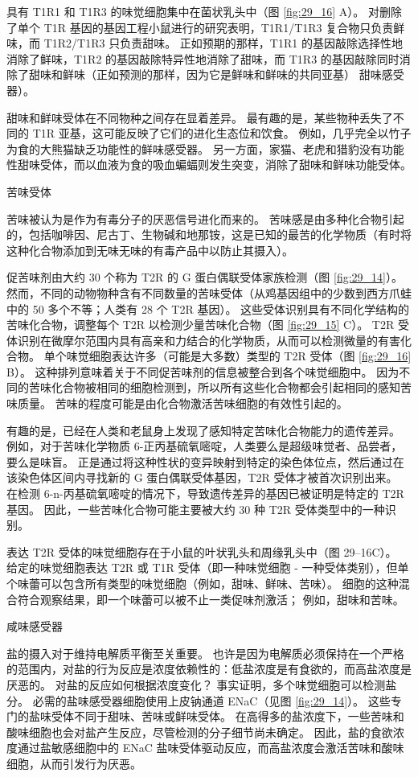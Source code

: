 具有 T1R1 和 T1R3 的味觉细胞集中在菌状乳头中（图 \ref{fig:29_16} A）。 对删除了单个 T1R 基因的基因工程小鼠进行的研究表明，T1R1/T1R3 复合物只负责鲜味，而 T1R2/T1R3 只负责甜味。 正如预期的那样，T1R1 的基因敲除选择性地消除了鲜味，T1R2 的基因敲除特异性地消除了甜味，而 T1R3 的基因敲除同时消除了甜味和鲜味（正如预测的那样，因为它是鲜味和鲜味的共同亚基） 甜味感受器）。

甜味和鲜味受体在不同物种之间存在显着差异。 最有趣的是，某些物种丢失了不同的 T1R 亚基，这可能反映了它们的进化生态位和饮食。 例如，几乎完全以竹子为食的大熊猫缺乏功能性的鲜味感受器。 另一方面，家猫、老虎和猎豹没有功能性甜味受体，而以血液为食的吸血蝙蝠则发生突变，消除了甜味和鲜味功能受体。

苦味受体

苦味被认为是作为有毒分子的厌恶信号进化而来的。 苦味感是由多种化合物引起的，包括咖啡因、尼古丁、生物碱和地那铵，这是已知的最苦的化学物质（有时将这种化合物添加到无味无味的有毒产品中以防止其摄入）。

促苦味剂由大约 30 个称为 T2R 的 G 蛋白偶联受体家族检测（图 \ref{fig:29_14}）。 然而，不同的动物物种含有不同数量的苦味受体（从鸡基因组中的少数到西方爪蛙中的 50 多个不等；人类有 28 个 T2R 基因）。 这些受体识别具有不同化学结构的苦味化合物，调整每个 T2R 以检测少量苦味化合物（图 \ref{fig:29_15} C）。 T2R 受体识别在微摩尔范围内具有高亲和力结合的化学物质，从而可以检测微量的有害化合物。 单个味觉细胞表达许多（可能是大多数）类型的 T2R 受体（图 \ref{fig:29_16} B）。 这种排列意味着关于不同促苦味剂的信息被整合到各个味觉细胞中。 因为不同的苦味化合物被相同的细胞检测到，所以所有这些化合物都会引起相同的感知苦味质量。 苦味的程度可能是由化合物激活苦味细胞的有效性引起的。

有趣的是，已经在人类和老鼠身上发现了感知特定苦味化合物能力的遗传差异。 例如，对于苦味化学物质 6-正丙基硫氧嘧啶，人类要么是超级味觉者、品尝者，要么是味盲。 正是通过将这种性状的变异映射到特定的染色体位点，然后通过在该染色体区间内寻找新的 G 蛋白偶联受体基因，T2R 受体才被首次识别出来。 在检测 6-n-丙基硫氧嘧啶的情况下，导致遗传差异的基因已被证明是特定的 T2R 基因。 因此，一些苦味化合物可能主要被大约 30 种 T2R 受体类型中的一种识别。

表达 T2R 受体的味觉细胞存在于小鼠的叶状乳头和周缘乳头中（图 29–16C）。 给定的味觉细胞表达 T2R 或 T1R 受体（即一种味觉细胞 - 一种受体类别），但单个味蕾可以包含所有类型的味觉细胞（例如，甜味、鲜味、苦味）。 细胞的这种混合符合观察结果，即一个味蕾可以被不止一类促味剂激活； 例如，甜味和苦味。

咸味感受器

盐的摄入对于维持电解质平衡至关重要。 也许是因为电解质必须保持在一个严格的范围内，对盐的行为反应是浓度依赖性的：低盐浓度是有食欲的，而高盐浓度是厌恶的。 对盐的反应如何根据浓度变化？ 事实证明，多个味觉细胞可以检测盐分。 必需的盐味感受器细胞使用上皮钠通道 ENaC（见图 \ref{fig:29_14}）。 这些专门的盐味受体不同于甜味、苦味或鲜味受体。 在高得多的盐浓度下，一些苦味和酸味细胞也会对盐产生反应，尽管检测的分子细节尚未确定。 因此，盐的食欲浓度通过盐敏感细胞中的 ENaC 盐味受体驱动反应，而高盐浓度会激活苦味和酸味细胞，从而引发行为厌恶。

